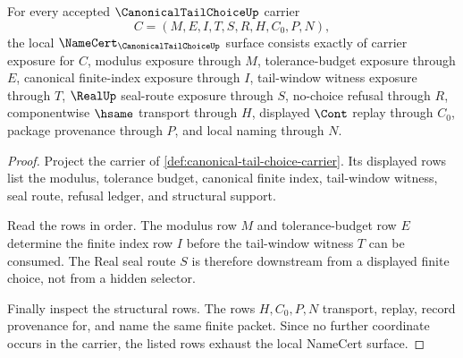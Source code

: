 \begin{theorem}
\label{thm:canonical-tail-choice-namecert-obligations}
For every accepted $\CanonicalTailChoiceUp$ carrier
$$
C=(M,E,I,T,S,R,H,C_0,P,N),
$$
the local $\NameCert_{\CanonicalTailChoiceUp}$ surface consists exactly of carrier exposure for $C$, modulus exposure through $M$, tolerance-budget exposure through $E$, canonical finite-index exposure through $I$, tail-window witness exposure through $T$, $\RealUp$ seal-route exposure through $S$, no-choice refusal through $R$, componentwise $\hsame$ transport through $H$, displayed $\Cont$ replay through $C_0$, package provenance through $P$, and local naming through $N$.
\end{theorem}
\begin{proof}
Project the carrier of \autoref{def:canonical-tail-choice-carrier}. Its displayed rows list the modulus, tolerance budget, canonical finite index, tail-window witness, seal route, refusal ledger, and structural support.

Read the rows in order. The modulus row $M$ and tolerance-budget row $E$ determine the finite index row $I$ before the tail-window witness $T$ can be consumed. The Real seal route $S$ is therefore downstream from a displayed finite choice, not from a hidden selector.

Finally inspect the structural rows. The rows $H,C_0,P,N$ transport, replay, record provenance for, and name the same finite packet. Since no further coordinate occurs in the carrier, the listed rows exhaust the local NameCert surface.
\end{proof}

